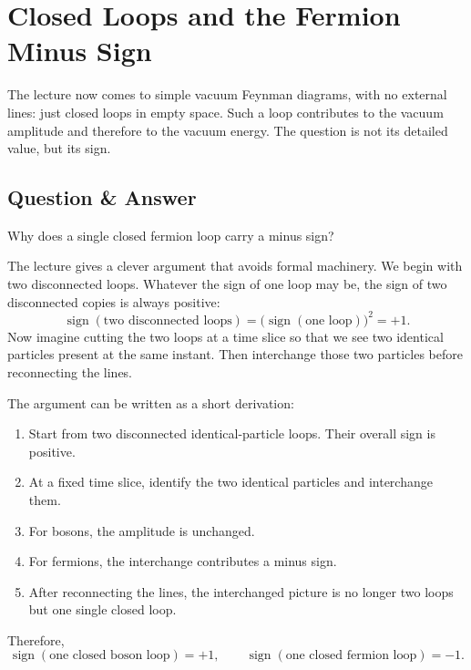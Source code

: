 \section{Closed Loops and the Fermion Minus Sign}

The lecture now comes to simple vacuum Feynman diagrams, with no external lines: just closed loops in empty space. Such a loop contributes to the vacuum amplitude and therefore to the vacuum energy. The question is not its detailed value, but its sign.

\subsection{Question \& Answer}

Why does a single closed fermion loop carry a minus sign?

The lecture gives a clever argument that avoids formal machinery. We begin with two disconnected loops. Whatever the sign of one loop may be, the sign of two disconnected copies is always positive:
\begin{equation}
\operatorname{sign}(\text{two disconnected loops})
=
\bigl(\operatorname{sign}(\text{one loop})\bigr)^2
=
+1.
\end{equation}
Now imagine cutting the two loops at a time slice so that we see two identical particles present at the same instant. Then interchange those two particles before reconnecting the lines.

The argument can be written as a short derivation:
\begin{enumerate}
\item Start from two disconnected identical-particle loops. Their overall sign is positive.
\item At a fixed time slice, identify the two identical particles and interchange them.
\item For bosons, the amplitude is unchanged.
\item For fermions, the interchange contributes a minus sign.
\item After reconnecting the lines, the interchanged picture is no longer two loops but one single closed loop.
\end{enumerate}

Therefore,
\begin{equation}
\operatorname{sign}(\text{one closed boson loop})=+1,
\qquad
\operatorname{sign}(\text{one closed fermion loop})=-1.
\end{equation}

